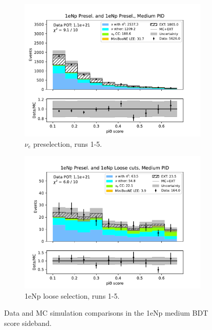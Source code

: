\begin{figure}[H]
\begin{subfigure}{0.5\linewidth}
        \includegraphics[width=\linewidth]{technote/Sidebands/Figures/NearSideband/near_sideband_pi0_score_run1234b4c4d5_NP_NP_MEDIUM_PID.pdf}
        \caption{$\nu_e$ preselection, runs 1-5.}
    \end{subfigure}%
    \begin{subfigure}{0.5\linewidth}
        \includegraphics[width=\linewidth]{technote/Sidebands/Figures/NearSideband/near_sideband_pi0_score_run1234b4c4d5_NP_NPL_MEDIUM_PID.pdf}
        \caption{1eNp loose selection, runs 1-5.}
    \end{subfigure}
    \caption{Data and MC simulation comparisons in the 1eNp medium BDT score sideband.}
\end{figure}

